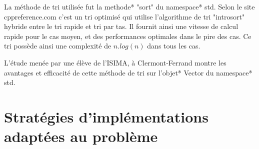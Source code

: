 \documentclass[stage2a]{tnreport}
\begin{document}
La méthode de tri utilisée fut la \gls{methode}* "sort" du \gls{namespace}* std. Selon le site cppreference.com\cite{sort} c'est un tri optimisé qui utilise l'algorithme de tri "introsort" hybride entre le tri rapide et tri par tas. Il fournit ainsi une vitesse de calcul rapide pour le cas moyen, et des performances optimales dans le pire des cas. Ce tri possède ainsi une complexité de \begin{math}n.log(n)\end{math} dans tous les cas.

L'étude\cite{PerfSort} menée par une élève de l'ISIMA, à Clermont-Ferrand montre les avantages et efficacité de cette méthode de tri sur l'\gls{objet}* Vector du \gls{namespace}* std.



\section{Stratégies d'implémentations adaptées au problème}
\end{document}
